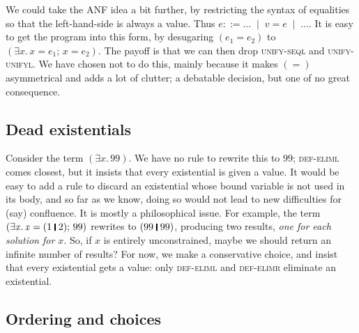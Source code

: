 \documentclass[acmsmall,review,dvipsnames]{acmart}
\newcommand{\Varid}[1]{\mathit{#1}}
\newcommand{\rulename}[1]{\textsc{\small #1}}
\newcommand{\vb}{\; \ensuremath{\mathop{\mid}} \;}    %
\begin{document}
We could take the ANF idea a bit further, by restricting the syntax of equalities so
that the left-hand-side is always a value.
Thus $e ::= \ldots \vb \ensuremath{\Varid{v}\mathrel{=}\Varid{e}} \vb \ldots$. It is easy to get the program into this form,
by desugaring \ensuremath{(\Varid{e}_{\mathrm{1}}\mathrel{=}\Varid{e}_{\mathrm{2}})} to \ensuremath{(\exists\Varid{x}.\,\Varid{x}\mathrel{=}\Varid{e}_{\mathrm{1}};\,\Varid{x}\mathrel{=}\Varid{e}_{\mathrm{2}})}.
The payoff is that we can then drop \rulename{unify-seql} and \rulename{unify-unifyl}.
We have chosen not to do this, mainly because it makes \ensuremath{(\mathrel{=})} asymmetrical and adds a lot of clutter;
a debatable decision, but one of no great consequence.

\subsection{Dead existentials}

Consider the term \ensuremath{(\exists\Varid{x}.\,\mathrm{99})}.  We have no rule to rewrite this to \ensuremath{\mathrm{99}}; \rulename{def-eliml} comes closest,
but it insists that every existential is given a value. It would be easy to add a rule to discard an existential
whose bound variable is not used in its body, and so far as we know, doing so would not lead to
new difficulties for (say) confluence.  It is mostly a philosophical issue.  For example, the term
\ensuremath{(\exists\Varid{x}.\,\Varid{x}\mathrel{=}(\mathrm{1}\;\rule[-0.3mm]{0.5mm}{2.5mm}\;\mathrm{2});\,\mathrm{99})} rewrites to \ensuremath{(\mathrm{99}\;\rule[-0.3mm]{0.5mm}{2.5mm}\;\mathrm{99})}, producing two results, \emph{one for each
  solution for \ensuremath{\Varid{x}}}.  So, if \ensuremath{\Varid{x}} is entirely unconstrained, maybe we should return an infinite number of results?
For now, we make a conservative choice, and insist that every existential gets a value:
only \rulename{def-eliml} and \rulename{def-elimr} eliminate an existential.

\subsection{Ordering and choices}
\end{document}
